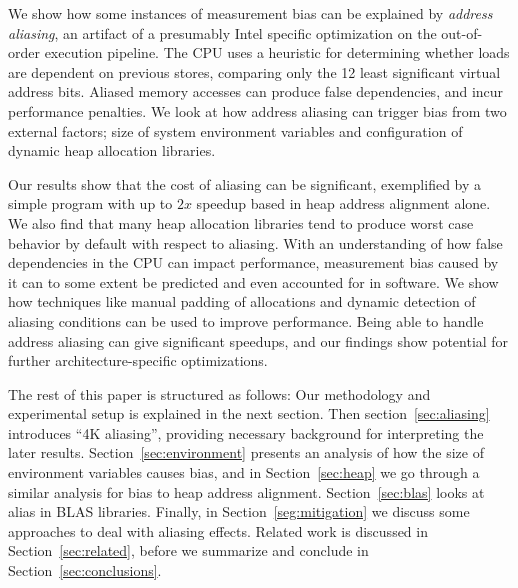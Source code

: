 \documentclass[10pt, conference, compsocconf]{IEEEtran}
\begin{document}
We show how some instances of measurement bias can be explained by \emph{address aliasing}, an artifact of a presumably Intel specific optimization on the out-of-order execution pipeline.
The CPU uses a heuristic for determining whether loads are dependent on previous stores, comparing only the 12 least significant virtual address bits.
Aliased memory accesses can produce false dependencies, and incur performance penalties.
We look at how address aliasing can trigger bias from two external factors; size of system environment variables and configuration of dynamic heap allocation libraries.

Our results show that the cost of aliasing can be significant, exemplified by a simple program with up to $2x$ speedup based in heap address alignment alone.
We also find that many heap allocation libraries tend to produce worst case behavior by default with respect to aliasing.%
With an understanding of how false dependencies in the CPU can impact performance, measurement bias caused by it can to some extent be predicted and even accounted for in software.
We show how techniques like manual padding of allocations and dynamic detection of aliasing conditions can be used to improve performance. 
Being able to handle address aliasing can give significant speedups, and our findings show potential for further architecture-specific optimizations.

The rest of this paper is structured as follows: Our methodology and experimental setup is explained in the next section.
Then section~\ref{sec:aliasing} introduces ``4K aliasing'', providing necessary background for interpreting the later results.
Section~\ref{sec:environment} presents an analysis of how the size of environment variables causes bias, and in Section~\ref{sec:heap} we go through a similar analysis for bias to heap address alignment.
Section~\ref{sec:blas} looks at alias in BLAS libraries.
Finally, in Section~\ref{seg:mitigation} we discuss some approaches to deal with aliasing effects.
Related work is discussed in Section~\ref{sec:related}, before we summarize and conclude in Section~\ref{sec:conclusions}.
\end{document}
